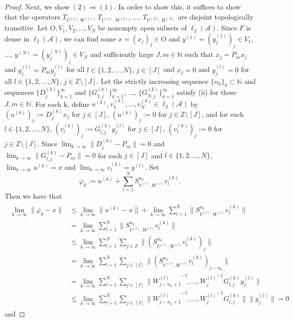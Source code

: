 \documentclass[10pt,a4paper]{amsart}
\begin{document}
\begin{proof}
Next, we show $(2)\Rightarrow(1)$. In order to show this, it suffices to show that the operators $T_{U^{(1)},W^{(1)}}$, $T_{U^{(2)},W^{(2)}}$, ..., $T_{U^{(N)},W^{(N)}}$ are disjoint topologically transitive. Let $O, V_{1}, V_{2}, ...,  V_{N}$ be nonempty open subsets of $\ell_{2}(\mathcal{A})$. Since $F$ is dense in $\ell_{2}(\mathcal{A})$, we can find some $x=(x_{j})_{j}\in O$ and $y^{(1)}=(y^{(1)}_{j})_{j}\in V_{1}$, ..., $y^{(N)}=(y^{(N)}_{j})_{j}\in V_{N}$ and sufficiently large $J, m\in\mathbb{N}$ such that $x_{j}=P_{m}x_{j}$ and $y^{(l)}_{j}=P_{m}y^{(l)}_{j}$ for all $l\in\{1,2,...,N\}$,   $j\in[J]$ and $x_{j}=0$ and $y^{(l)}_{j}=0$ for all $l\in\{1,2,...,N\}$, $j\in \mathbb{Z}\setminus[J]$. Let the strictly increasing sequence $\{n_{k}\}_{k}\subset\mathbb{N}$ and sequences $\{D^{(k)}_{j}\}^{\infty}_{k=1}$ and $\{G^{(k)}_{1,j}\}^{\infty}_{k=1}$, ..., $\{G^{(k)}_{N,j}\}^{\infty}_{k=1}$ satisfy (ii) for these $J,m\in\mathbb{N}$. For each k, define $u^{(k)}, v^{(k)}_{1}, ..., v^{(k)}_{N}\in \ell_{2}(\mathcal{A})$ by $(u^{(k)})_{j}:=D^{(k)}_{j}x_{j}$ for $j\in[J]$, $(u^{(k)})_{j}:=0$ for $j\in \mathbb{Z}\setminus [J]$, and for each $l\in\{1,2,...,N\}$, $(v^{(k)}_{l})_{j}:=G^{(k)}_{l, j}y^{(l)}_{j}$ for $j\in[J]$, $(v^{(k)}_{l})_{j}:=0$ for $j\in \mathbb{Z}\setminus [J]$. Since $\lim_{k\rightarrow\infty}\|D^{(k)}_{j}-P_{m}\|=0$ and $\lim_{k\rightarrow\infty}\|G^{(k)}_{l,j}-P_{m}\|=0$  for each $j\in [J]$ and $l\in\{1,2,...,N\}$, $\lim_{k\rightarrow\infty}u^{(k)}=x$ and $\lim_{k\rightarrow\infty}v^{(k)}_{l}=y^{(l)}$. Set
\[\varphi_{k}:=u^{(k)}+\sum^{N}_{l=1}S^{n_{k}}_{U^{(l)},W^{(l)}}v^{(k)}_{l}.\]
Then we have that
\begin{eqnarray}\begin{split}\nonumber
\lim_{k\rightarrow\infty}\|\varphi_{k}-x\|&\leq \lim_{k\rightarrow\infty}\|u^{(k)}-x\|+ \lim_{k\rightarrow\infty}\sum^{N}_{l=1}\|S^{n_{k}}_{U^{(l)},W^{(l)}}v^{(k)}_{l}\|\\
&=\lim_{k\rightarrow\infty}\sum^{N}_{l=1}\|S^{n_{k}}_{U^{(l)},W^{(l)}}v^{(k)}_{l}\|\\
&\leq
\lim_{k\rightarrow\infty}\sum^{N}_{l=1}\sum_{j\in\mathbb{Z}}\|(S^{n_{k}}_{U^{(l)},W^{(l)}}v^{(k)}_{l})_{j}\|\\
&=\lim_{k\rightarrow\infty}\sum^{N}_{l=1}\sum_{j\in[J]}\|(S^{n_{k}}_{U^{(l)},W^{(l)}}v^{(k)}_{l})_{j-n_{k}}\|\\
&=\lim_{k\rightarrow\infty}\sum^{N}_{l=1}\sum_{j\in[J]}\|{W^{(l)}_{j-n_{k}+1}}^{-1},...,{W^{(l)}_{j}}^{-1} G^{(k)}_{l,j}y^{(l)}_{j}\|\\
&\leq\lim_{k\rightarrow\infty}\sum^{N}_{l=1}\sum_{j\in[J]}\|{W^{(l)}_{j-n_{k}+1}}^{-1},...,{W^{(l)}_{j}}^{-1} G^{(k)}_{l,j}\| \|y^{(l)}_{j}\|=0
\end{split}\end{eqnarray}
and


\end{proof}
\end{document}
